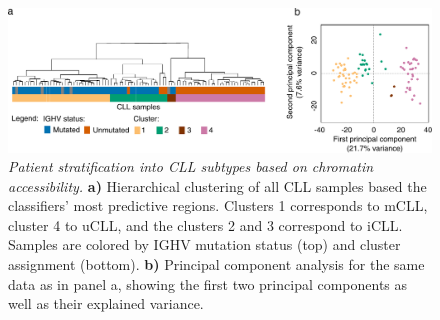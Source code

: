 \documentclass[10pt,]{article}
\begin{document}
\begin{figure}
\centering
\includegraphics[width=1.000\hsize]{figures/Figure4.pdf}
\caption{\emph{Patient stratification into CLL subtypes based on
chromatin accessibility.} \textbf{a)} Hierarchical clustering of all CLL
samples based the classifiers' most predictive regions. Clusters 1
corresponds to mCLL, cluster 4 to uCLL, and the clusters 2 and 3
correspond to iCLL. Samples are colored by IGHV mutation status (top)
and cluster assignment (bottom). \textbf{b)} Principal component
analysis for the same data as in panel a, showing the first two
principal components as well as their explained
variance.}\label{Figure4}
\end{figure}
\end{document}
